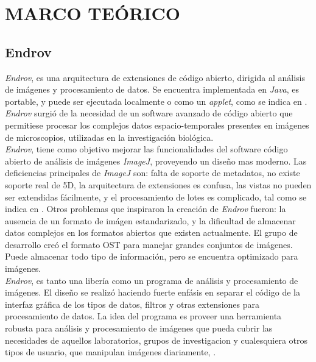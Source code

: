 \thispagestyle{empty}
\cleardoublepage
\chapter{MARCO TE\'ORICO}
\label{sec:dev}
\section{Endrov}
\label{sec:endrov}

\emph{Endrov}, es una arquitectura de extensiones de c\'odigo abierto,
dirigida al an\'alisis de im\'agenes y procesamiento de datos.
Se encuentra implementada en \emph{Java}, es portable, y puede ser ejecutada localmente o como 
un \emph{applet}, como se indica en \cite{web:endrov}. \emph{Endrov} surgi\'o
de la necesidad de un software avanzado de c\'odigo abierto que permitiese procesar 
los complejos datos espacio-temporales presentes en im\'agenes de microscopios, 
utilizadas en la investigaci\'on biol\'ogica.\\

\emph{Endrov}, tiene como objetivo mejorar las funcionalidades del software c\'odigo abierto
de an\'alisis de im\'agenes \emph{ImageJ}, proveyendo un dise\~no mas moderno. 
Las deficiencias principales de \emph{ImageJ} son: falta de soporte de metadatos,
no existe soporte real de 5D, la arquitectura de extensiones es confusa, las vistas
no pueden ser extendidas fácilmente, y el procesamiento de lotes es complicado, 
tal como se indica en \cite{web:endrovhome}.
Otros problemas que inspiraron la creaci\'on de \emph{Endrov} fueron: la ausencia de un 
formato de im\'agen estandarizado, y la dificultad
de almacenar datos complejos en los formatos abiertos que existen actualmente.
El grupo de desarrollo cre\'o el formato OST para manejar grandes conjuntos de im\'agenes.
Puede almacenar todo tipo de informaci\'on, pero se encuentra optimizado para im\'agenes.\\

\emph{Endrov}, es tanto una liber\'ia como un programa de an\'alisis y procesamiento de 
im\'agenes. El dise\~no se realiz\'o haciendo fuerte enf\'asis en separar el c\'odigo
de la interfaz gr\'afica de los tipos de datos, filtros y otras extensiones para 
procesamiento de datos. La idea del programa es proveer una herramienta robusta para
an\'alisis y procesamiento de im\'agenes que pueda cubrir las necesidades de aquellos
laboratorios, grupos de investigacion y cualesquiera otros tipos de usuario, que 
manipulan im\'agenes diariamente, \cite{web:endrov}.\\

